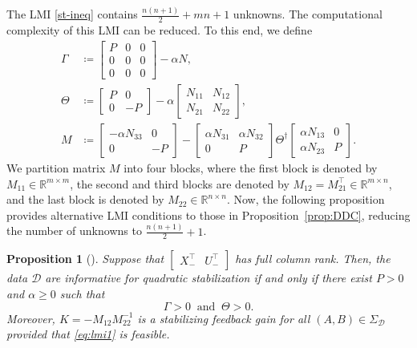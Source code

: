 \documentclass[9pt,shortpaper,twoside,web]{ieeecolor}
\newcommand{\R}{\mathbb{R}}
\newcommand{\mac}[1]{\mathcal{#1}}
\newtheorem{proposition}[theorem]{Proposition}
\begin{document}
 The LMI \eqref{st-ineq} contains $\frac{n(n+1)}{2}+mn+1$ unknowns. The computational complexity of this LMI can be reduced. To this end, we define
\begin{equation}
\begin{split}
\Gamma &\coloneqq \begin{bmatrix}
P & 0 & 0 \\
0 & 0 & 0 \\
0 & 0 & 0
\end{bmatrix}-\alpha N,\\
\Theta&\coloneqq\begin{bmatrix}
P & 0 \\
0 & -P
\end{bmatrix}-\alpha\begin{bmatrix}
N_{11} & N_{12} \\
N_{21} & N_{22}
\end{bmatrix}, \\
M&\coloneqq\begin{bmatrix}
-\alpha N_{33} & 0 \\
0 & -P
\end{bmatrix}-\begin{bmatrix}
\alpha N_{31} & \alpha N_{32} \\
0 & P
\end{bmatrix}\Theta^{\dagger} \begin{bmatrix}
\alpha N_{13} & 0 \\
\alpha N_{23} & P
\end{bmatrix}\!\!.
\end{split}
\end{equation}	
We partition matrix $M$ into four blocks, where the first block is denoted by $M_{11} \in \R^{m \times m}$, the second and third blocks are denoted by $M_{12}=M_{21}^\top \in \R^{m \times n}$, and the last block is denoted by $M_{22} \in \R^{n \times n}$. Now, the following proposition provides alternative LMI conditions to those in Proposition~\ref{prop:DDC}, reducing the number of unknowns to $\frac{n(n+1)}{2}+1$. %

\begin{proposition}[{\cite[Thm. 5.3(b)]{HenkQMI2023}}]
\label{prop:1p}
Suppose that $\begin{bmatrix}
X_-^\top & U_-^\top
\end{bmatrix}$ has full column rank. Then, the data $\mac{D}$ are informative for quadratic stabilization \emph{if and only if} there exist $P > 0$ and $\alpha\geq 0$ such that 
\begin{equation}
\label{eq:lmi1}
\Gamma > 0 \ \text{ and } \ \Theta > 0.
\end{equation}
Moreover, $K=-M_{12}M_{22}^{-1}$ is a stabilizing feedback gain for all $(A,B) \in \Sigma_\mathcal{D}$ provided that \eqref{eq:lmi1} is feasible. 
\end{proposition}
\end{document}
